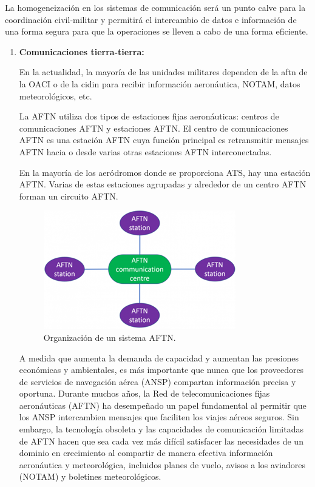 La homogeneización en los sistemas de comunicación será un punto calve para la coordinación civil-militar y permitirá el intercambio de datos e información de una forma segura para que la operaciones se lleven a cabo de una forma eficiente.

\begin{enumerate}
    \item \textbf{Comunicaciones tierra-tierra:}
    
    En la actualidad, la mayoría de las unidades militares dependen de la \acrfull{aftn} de la OACI o de la \acrfull{cidin} para recibir información aeronáutica, NOTAM, datos meteorológicos, etc. 
    
    La AFTN utiliza dos tipos de estaciones fijas aeronáuticas: centros de comunicaciones AFTN y estaciones AFTN. El centro de comunicaciones AFTN es una estación AFTN cuya función principal es retransmitir mensajes AFTN hacia o desde varias otras estaciones AFTN interconectadas.

    En la mayoría de los aeródromos donde se proporciona ATS, hay una estación AFTN. Varias de estas estaciones agrupadas y alrededor de un centro AFTN forman un circuito AFTN.
    
    \begin{figure}[H]
        \centering
        \includegraphics[width=0.5\linewidth]{figuras/aftn.png}
        \caption{Organización de un sistema AFTN.}
        \label{fig:aftn}
    \end{figure}
    
    A medida que aumenta la demanda de capacidad y aumentan las presiones económicas y ambientales, es más importante que nunca que los proveedores de servicios de navegación aérea (ANSP) compartan información precisa y oportuna. Durante muchos años, la Red de telecomunicaciones fijas aeronáuticas (AFTN) ha desempeñado un papel fundamental al permitir que los ANSP intercambien mensajes que faciliten los viajes aéreos seguros. Sin embargo, la tecnología obsoleta y las capacidades de comunicación limitadas de AFTN hacen que sea cada vez más difícil satisfacer las necesidades de un dominio en crecimiento al compartir de manera efectiva información aeronáutica y meteorológica, incluidos planes de vuelo, avisos a los aviadores (NOTAM) y boletines meteorológicos.


\end{enumerate}
